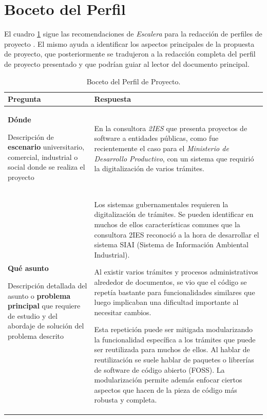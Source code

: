 \section{Boceto del Perfil}

El cuadro \ref{table:boceto} sigue las recomendaciones de \textit{Escalera} para la redacción de perfiles de proyecto \cite{escaleraTECNICASIDCIENCIAS2006}.
El mismo ayuda a identificar los aspectos principales de la propuesta de proyecto, que posteriormente se tradujeron a la redacción completa del perfil de proyecto presentado y que podrían guiar al lector del documento principal.
\renewcommand{\arraystretch}{2.1}
\begin{longtable}[c]{p{}p{}}
    \caption{Boceto del Perfil de Proyecto. \label{table:boceto}}\\ \toprule

    Pregunta & Respuesta \\ \midrule
    \endhead

    \textbf{Dónde}

    {\tiny Descripción de \textbf{escenario} universitario, comercial, industrial o social donde se realiza el proyecto} &

    En la consultora \textit{2IES} que presenta proyectos de software a entidades públicas, como fue recientemente el caso para el \textit{Ministerio de Desarrollo Productivo}, con un sistema que requirió la digitalización de varios trámites.\\

    \textbf{Qué asunto}

    {\tiny Descripción detallada del asunto o \textbf{problema principal} que requiere de estudio y del abordaje de solución del problema descrito} &

    Los sistemas gubernamentales requieren la digitalización de trámites. Se pueden identificar en muchos de ellos características comunes que la consultora 2IES reconoció a la hora de desarrollar el sistema SIAI (Sistema de Información Ambiental Industrial).

    Al existir varios trámites y procesos administrativos alrededor de documentos, se vio que el código se repetía bastante para funcionalidades similares que luego implicaban una dificultad importante al necesitar cambios.

    Esta repetición puede ser mitigada modularizando la funcionalidad específica a los trámites que puede ser reutilizada para muchos de ellos. Al hablar de reutilización se suele hablar de paquetes o librerías de software de código abierto (FOSS). La modularización permite además enfocar ciertos aspectos que hacen de la pieza de código más robusta y completa. \\


\end{longtable}
